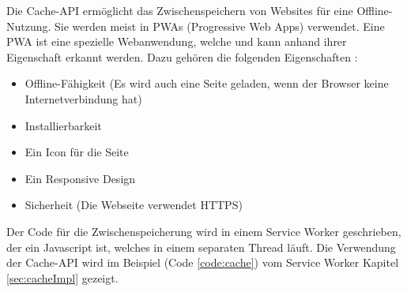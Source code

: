 
Die Cache-API ermöglicht das Zwischenspeichern von Websites für eine Offline-Nutzung.
Sie werden meist in PWAs (Progressive Web Apps) verwendet. Eine PWA ist eine spezielle Webanwendung, welche und kann anhand ihrer Eigenschaft erkannt werden. Dazu gehören die folgenden Eigenschaften \cite{datacodedesignPWA}:
\begin{itemize}
    \item Offline-Fähigkeit (Es wird auch eine Seite geladen, wenn der Browser keine Internetverbindung hat)
    \item Installierbarkeit 
    \item Ein Icon für die Seite
    \item Ein Responsive Design
    \item Sicherheit (Die Webseite verwendet HTTPS)
\end{itemize}

Der Code für die Zwischenspeicherung wird in einem Service Worker geschrieben, der ein Javascript ist, welches in einem separaten Thread läuft. Die Verwendung der Cache-API wird im Beispiel (Code \ref{code:cache}) vom Service Worker Kapitel \ref{sec:cacheImpl} gezeigt.